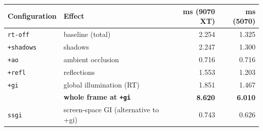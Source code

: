 \begin{tabular}{llrr}
\toprule
Configuration & Effect & ms (9070 XT) & ms (5070) \\
\midrule
\texttt{rt-off}   & baseline (total) & 2.254 & 1.325 \\
\texttt{+shadows} & shadows & 2.247 & 1.300 \\
\texttt{+ao} & ambient occlusion & 0.716 & 0.716 \\
\texttt{+refl} & reflections & 1.553 & 1.203 \\
\texttt{+gi} & global illumination (RT) & 1.851 & 1.467 \\
\midrule
 & \textbf{whole frame at \texttt{+gi}} & \textbf{8.620} & \textbf{6.010} \\
\midrule
\texttt{ssgi} & screen-space GI (alternative to +gi) & 0.743 & 0.626 \\
\bottomrule
\end{tabular}
